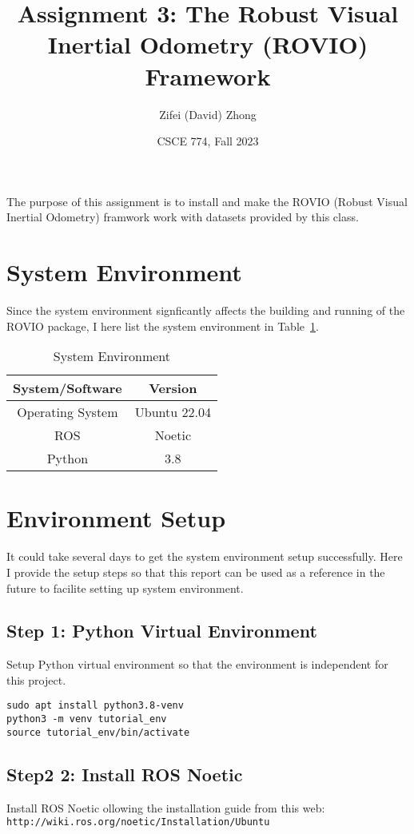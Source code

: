 \documentclass[11pt, oneside]{article}   	%
\title{Assignment 3: The Robust Visual Inertial Odometry (ROVIO) Framework}
\author{Zifei (David) Zhong}
\date{CSCE 774, Fall 2023}
\begin{document}
\maketitle
The purpose of this assignment is to install and make the ROVIO
(Robust Visual Inertial Odometry) framwork work with datasets provided
by this class.

\section{System Environment}
Since the system environment signficantly affects the building and
running of the ROVIO package, I here list the system environment in
Table~\ref{tab.sys}. 

\begin{table}[ht]
  \centering
  \begin{tabular}{|c|c|}
    \hline
    System/Software & Version \\
    \hline
    \hline
    Operating System & Ubuntu 22.04 \\
    \hline
    ROS & Noetic \\
    \hline
    Python & 3.8 \\
    \hline 
  \end{tabular}
  \caption{System Environment}
  \label{tab.sys}
\end{table}

\section{Environment Setup}
It could take several days to get the system environment setup
successfully. Here I provide the setup steps so that this report can
be used as a reference in the future to facilite setting up system
environment.

\subsection{Step 1: Python Virtual Environment}
Setup Python virtual environment so that the environment is
independent for this project.

\begin{verbatim}
sudo apt install python3.8-venv
python3 -m venv tutorial_env
source tutorial_env/bin/activate
\end{verbatim}


\subsection{Step2 2: Install ROS Noetic}
Install ROS Noetic ollowing the installation guide from this web:\\
\verb+http://wiki.ros.org/noetic/Installation/Ubuntu+
\end{document}
